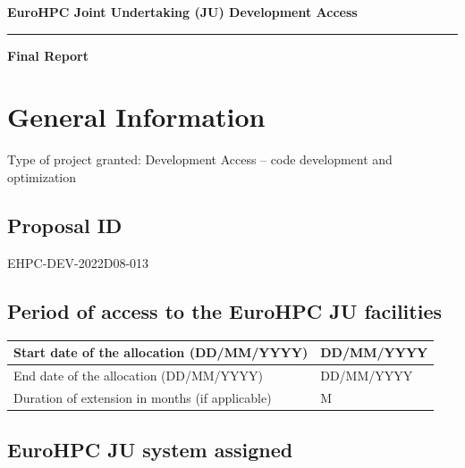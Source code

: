 \documentclass[a4paper,12pt]{article}
\makeatletter
\newif\ifshowinstructions
\newcommand{\instructions}[1]{\ifshowinstructions {\fontsize{10}{11}\selectfont \textit{#1}} \fi}
\newenvironment{jubox}
  {
    \begin{mdframed}
    \globalcolor{blue}
  }
  {
    \end{mdframed}
  }
\newcommand{\checkbox}[1]{%
  \ifthenelse{\equal{#1}{yes}}{$\boxtimes$}{$\Box$}%
}
\newcommand{\globalcolor}[1]{%
  \color{#1}\global\let\default@color\current@color
}
\makeatother
\begin{document}
{\fontsize{20}{32} \selectfont\textbf{EuroHPC Joint Undertaking (JU) Development Access}}
{\color{orng}\hrule height 1pt}
{\fontsize{20}{32} \selectfont\textbf{Final Report}}

\section{General Information}

Type of project granted: Development Access -- code development and optimization

\subsection{Proposal ID}

\instructions{Please fill in the information in the box below.}

\begin{jubox}
  EHPC-DEV-2022D08-013
\end{jubox}

\subsection{Period of access to the EuroHPC JU facilities}

\instructions{Please fill in the information in the box below.}

\begin{tabulary}{\textwidth}{|p{0.47\textwidth}|p{0.47\textwidth}|}
  \hline
  Start date of the allocation (DD/MM/YYYY) & DD/MM/YYYY \\
  \hline
  End date of the allocation (DD/MM/YYYY) & DD/MM/YYYY \\
  \hline
  Duration of extension in months (if applicable) & M \\
  \hline
\end{tabulary}

\subsection{EuroHPC JU system assigned}

\instructions{Plese click once in the box to select it, click again to unselect.}

\end{document}
